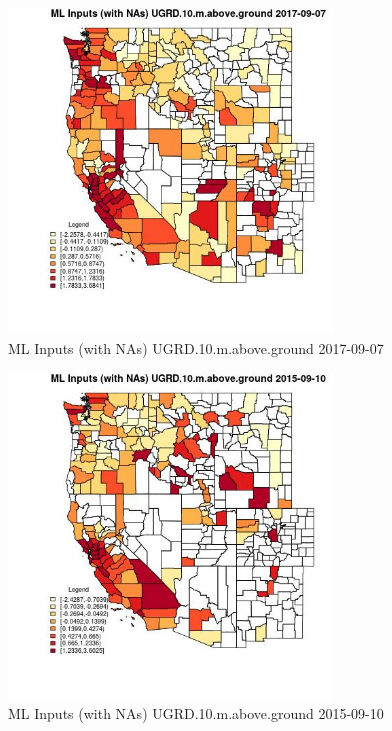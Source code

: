 \begin{figure} 
\centering  
\includegraphics[width=0.77\textwidth]{Code_Outputs/Report_ML_input_PM25_Step4_part_e_de_duplicated_aves_compiled_2019-05-21wNAs_CountyUGRD10mabovegroundMean2017-09-07.jpg} 
\caption{\label{fig:Report_ML_input_PM25_Step4_part_e_de_duplicated_aves_compiled_2019-05-21wNAsCountyUGRD10mabovegroundMean2017-09-07}ML Inputs (with NAs) UGRD.10.m.above.ground 2017-09-07} 
\end{figure} 
 

\begin{figure} 
\centering  
\includegraphics[width=0.77\textwidth]{Code_Outputs/Report_ML_input_PM25_Step4_part_e_de_duplicated_aves_compiled_2019-05-21wNAs_CountyUGRD10mabovegroundMean2015-09-10.jpg} 
\caption{\label{fig:Report_ML_input_PM25_Step4_part_e_de_duplicated_aves_compiled_2019-05-21wNAsCountyUGRD10mabovegroundMean2015-09-10}ML Inputs (with NAs) UGRD.10.m.above.ground 2015-09-10} 
\end{figure} 
 


